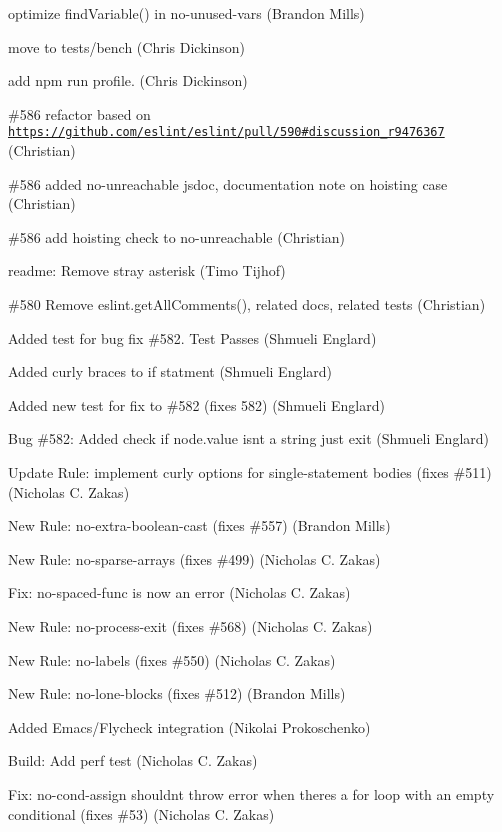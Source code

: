 \begin{DoxyItemize}
\item optimize find\+Variable() in no-\/unused-\/vars (Brandon Mills)
\item move to tests/bench (Chris Dickinson)
\item add {\ttfamily npm run profile}. (Chris Dickinson)
\item \#586 refactor based on \href{https://github.com/eslint/eslint/pull/590#discussion_r9476367}{\tt https\+://github.\+com/eslint/eslint/pull/590\#discussion\+\_\+r9476367} (Christian)
\item \#586 added no-\/unreachable jsdoc, documentation note on hoisting case (Christian)
\item \#586 add hoisting check to no-\/unreachable (Christian)
\item readme\+: Remove stray asterisk (Timo Tijhof)
\item \#580 Remove eslint.\+get\+All\+Comments(), related docs, related tests (Christian)
\item Added test for bug fix \#582. Test Passes (Shmueli Englard)
\item Added curly braces to if statment (Shmueli Englard)
\item Added new test for fix to \#582 (fixes 582) (Shmueli Englard)
\item Bug \#582\+: Added check if node.\+value isn\textquotesingle{}t a string just exit (Shmueli Englard)
\item Update Rule\+: implement curly options for single-\/statement bodies (fixes \#511) (Nicholas C. Zakas)
\item New Rule\+: no-\/extra-\/boolean-\/cast (fixes \#557) (Brandon Mills)
\item New Rule\+: no-\/sparse-\/arrays (fixes \#499) (Nicholas C. Zakas)
\item Fix\+: no-\/spaced-\/func is now an error (Nicholas C. Zakas)
\item New Rule\+: no-\/process-\/exit (fixes \#568) (Nicholas C. Zakas)
\item New Rule\+: no-\/labels (fixes \#550) (Nicholas C. Zakas)
\item New Rule\+: no-\/lone-\/blocks (fixes \#512) (Brandon Mills)
\item Added Emacs/\+Flycheck integration (Nikolai Prokoschenko)
\item Build\+: Add perf test (Nicholas C. Zakas)
\item Fix\+: no-\/cond-\/assign shouldn\textquotesingle{}t throw error when there\textquotesingle{}s a for loop with an empty conditional (fixes \#53) (Nicholas C. Zakas)

\end{DoxyItemize}
